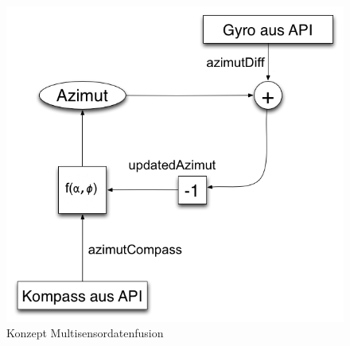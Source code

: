 \begin{figure}[htb]
\centering
\includegraphics[scale=0.5]{figures/struktur}
\caption{Konzept Multisensordatenfusion}
\label{fig:struktur}
\end{figure}






